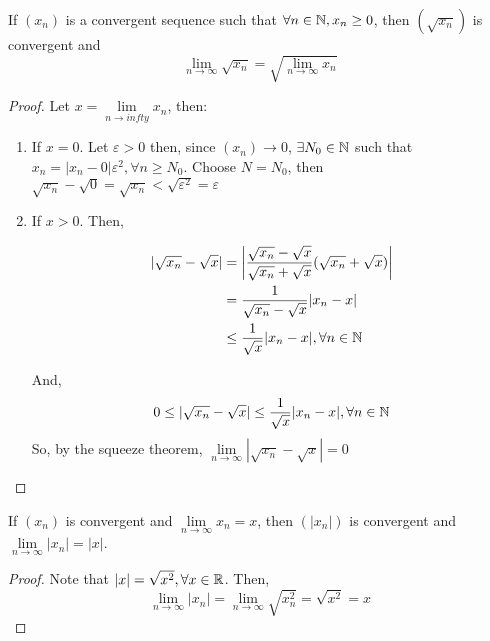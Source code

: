 \begin{theorem}
    If $(x_n)$ is a convergent sequence such that $\forall n \in \mathbb{N}, x_n \geq 0$, then $(\sqrt{x_n})$ is convergent and
    \begin{equation}
        \lim \limits_{n \to \infty} \sqrt{x_n} = \sqrt{\lim \limits_{n \to \infty} x_n}
    \end{equation}
\end{theorem}

\begin{proof}
    Let $x = \lim \limits_{n \to infty} x_n$, then:
    \begin{enumerate}
        \item If $x = 0$. Let $\varepsilon > 0$ then, since $(x_n) \to 0$, $\exists N_0 \in \mathbb{N}$ such that $x_n = |x_n-0| \varepsilon^2, \forall n \geq N_0$. Choose $N = N_0$, then $\sqrt{x_n}-\sqrt{0} = \sqrt{x_n} < \sqrt{\varepsilon^2} = \varepsilon$
        \item If $ x > 0$. Then, 
        
        \begin{align}
            |\sqrt{x_n} - \sqrt{x}| &= \left |
                \frac{\sqrt{x_n}-\sqrt{x}}{\sqrt{x_n}+\sqrt{x}}(\sqrt{x_n}+\sqrt{x})
            \right | \\
            &= \frac{1}{\sqrt{x_n} - \sqrt{x}}|x_n-x| \\
            &\leq \frac{1}{\sqrt{x}}|x_n-x|, \forall n \in \mathbb{N}
        \end{align}
        
        And,
        \begin{equation*}
            0 \leq |\sqrt{x_n}-\sqrt{x}| \leq \frac{1}{\sqrt{x}}|x_n-x|, \forall n \in \mathbb{N}
        \end{equation*}
        So, by the squeeze theorem, $\lim \limits_{n\to\infty} |\sqrt{x_n}-\sqrt{x}| = 0$
    \end{enumerate}
\end{proof}

\begin{theorem}
    If $(x_n)$ is convergent and $\lim \limits_{n\to\infty} x_n = x$, then $(|x_n|)$ is convergent and $\lim \limits_{n \to \infty} |x_n| = |x|$.
\end{theorem}

\begin{proof}
    Note that $|x| = \sqrt{x^2}, \forall x \in \mathbb{R}$. Then,
    \begin{equation*}
        \lim \limits_{n\to \infty} |x_n| = \lim \limits_{n\to \infty} \sqrt{x_n^2} = \sqrt{x^2} = x
    \end{equation*}
\end{proof}

